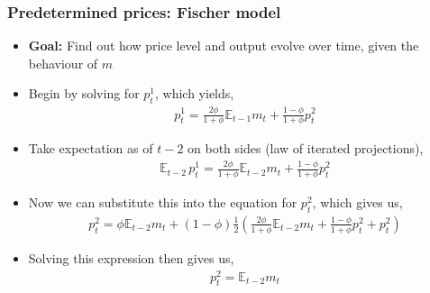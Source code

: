 \documentclass[10pt, xcolor=x11names, table]{beamer}
\begin{document}
\begin{frame}
\frametitle{Predetermined prices: Fischer model}
\begin{itemize}
\item \textbf{Goal:} Find out how price level and output evolve over time, given the behaviour of $m$
\item Begin by solving for $p^{1}_{t}$, which yields,
\begin{align*}
p_{t}^{1} = \frac{2\phi}{1+\phi}\mathbb{E}_{t-1}{m_{t}} + \frac{1-\phi}{1+\phi}p_{t}^{2}
\end{align*}
\item Take expectation as of $t-2$ on both sides (law of iterated projections),
\begin{align*}
\mathbb{E}_{t-2}\,p_{t}^{1} = \frac{2\phi}{1+\phi}\mathbb{E}_{t-2}{m_{t}} + \frac{1-\phi}{1+\phi}p_{t}^{2}
\end{align*}
\item Now we can substitute this into the equation for $p_{t}^{2}$, which gives us,
\begin{align*}
p_{t}^{2} = \phi\mathbb{E}_{t-2}{m_{t}} + (1-\phi)\frac{1}{2}\left(\frac{2\phi}{1+\phi}\mathbb{E}_{t-2}{m_{t}} + \frac{1-\phi}{1+\phi}p_{t}^{2} + p_{t}^{2}\right)
\end{align*}
\item Solving this expression then gives us,
\begin{align*}
p_{t}^{2} = \mathbb{E}_{t-2}m_{t}
\end{align*}
\end{itemize}
\end{frame}
\end{document}
